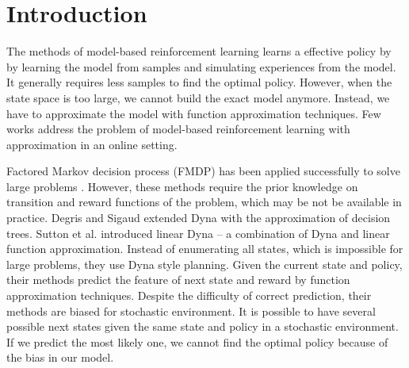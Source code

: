 \documentclass{article} %
\begin{document}

\section{Introduction}


The methods of model-based reinforcement learning learns a effective policy by 
by learning the model from samples and simulating experiences
from the model. It generally requires less samples to find the optimal policy. 
However, when the state space is too large, we cannot build the exact model anymore.
Instead, we have to approximate the model with function approximation techniques. Few works address 
the problem of model-based reinforcement learning with approximation in an online setting.

Factored Markov decision process (FMDP) has been applied successfully to solve large 
problems \cite{ApproxFactor} \cite{SPUDD}. However, these methods require the prior knowledge
on transition and reward functions of the problem, which may be not be available in practice.
Degris and Sigaud \cite{ApproxTree} extended Dyna \cite{Dyna} with the approximation of decision trees.
Sutton et al. \cite{ApproxDyna} introduced linear Dyna -- a combination 
of Dyna and linear function approximation. 
Instead of enumerating all states, which is impossible for large problems, they
use Dyna style planning. Given the current state and policy, 
their methods predict the feature of next state and reward by function approximation
techniques. Despite the difficulty of correct prediction, their methods are biased 
for stochastic environment. It is possible to have
several possible next states given the same state and policy in a stochastic environment.
If we predict the most likely one, we cannot find the optimal policy because of the bias in our model.
\end{document}

